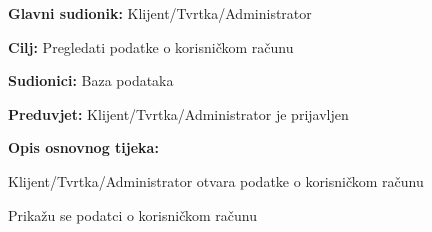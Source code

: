 \noindent {}
\begin{packed_item}
	
	\item \textbf{Glavni sudionik:} Klijent/Tvrtka/Administrator
	\item \textbf{Cilj:} Pregledati podatke o korisničkom računu
	\item \textbf{Sudionici:} Baza podataka
	\item \textbf{Preduvjet:} Klijent/Tvrtka/Administrator je prijavljen
	\item \textbf{Opis osnovnog tijeka:}
	
	\item[] \begin{packed_enum}
		
		\item Klijent/Tvrtka/Administrator otvara podatke o korisničkom računu
		\item Prikažu se podatci o korisničkom računu
	
	\end{packed_enum}
	
\end{packed_item}

\pagebreak

